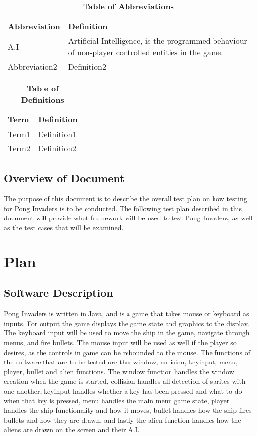 \documentclass[12pt, titlepage]{article}
\begin{document}
\begin{table}[hbp]
\caption{\textbf{Table of Abbreviations}} \label{Table}

\begin{tabularx}{\textwidth}{p{3cm}X}
\toprule
\textbf{Abbreviation} & \textbf{Definition} \\
\midrule
A.I & Artificial Intelligence, is the programmed behaviour of non-player controlled entities in the game.\\
Abbreviation2 & Definition2\\
\bottomrule
\end{tabularx}

\end{table}

\begin{table}[!htbp]
\caption{\textbf{Table of Definitions}} \label{Table}

\begin{tabularx}{\textwidth}{p{3cm}X}
\toprule
\textbf{Term} & \textbf{Definition}\\
\midrule
Term1 & Definition1\\
Term2 & Definition2\\
\bottomrule
\end{tabularx}

\end{table}	

\subsection{Overview of Document}
The purpose of this document is to describe the overall test plan on
how testing for Pong Invaders is to be conducted. The following test plan
described in this document will provide what framework will be used to test
Pong Invaders, as well as the test cases that will be examined.

\section{Plan}
	
\subsection{Software Description}
Pong Invaders is written in Java, and is a game that takes mouse or keyboard as
inputs. For output the game displays the game state and graphics to the display.
The keyboard input will be used to move the ship in the game, navigate through
menus, and fire bullets. The mouse input will be used as well if the player so
desires, as the controls in game can be rebounded to the mouse. The functions of
the software that are to be tested are the: window, collision, keyinput, menu,
player, bullet and alien functions. The window function handles the window
creation when the game is started, collision handles all detection of sprites
with one another, keyinput handles whether a key has been pressed and what to do
when that key is pressed, menu handles the main menu game state, player handles
the ship functionality and how it moves, bullet handles how the ship fires
bullets and how they are drawn, and lastly the alien function handles how the
aliens are drawn on the screen and their A.I.
\end{document}
